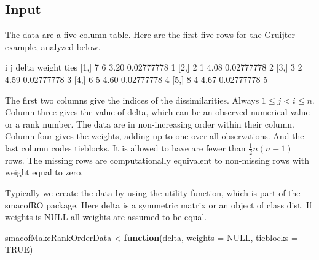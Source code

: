 \documentclass[
  12pt,
]{article}
\newenvironment{Shaded}{\begin{snugshade}}{\end{snugshade}}
\newcommand{\AttributeTok}[1]{\textcolor[rgb]{0.13,0.29,0.53}{#1}}
\newcommand{\ConstantTok}[1]{\textcolor[rgb]{0.56,0.35,0.01}{#1}}
\newcommand{\ControlFlowTok}[1]{\textcolor[rgb]{0.13,0.29,0.53}{\textbf{#1}}}
\newcommand{\DecValTok}[1]{\textcolor[rgb]{0.00,0.00,0.81}{#1}}
\newcommand{\FloatTok}[1]{\textcolor[rgb]{0.00,0.00,0.81}{#1}}
\newcommand{\NormalTok}[1]{#1}
\newcommand{\OtherTok}[1]{\textcolor[rgb]{0.56,0.35,0.01}{#1}}
\begin{document}
\subsection{Input}\label{input}

The data are a five column table. Here are the first five rows for
the Gruijter example, analyzed below.

\begin{Shaded}
\begin{Highlighting}[]
\NormalTok{     i j delta     weight ties}
\NormalTok{[}\DecValTok{1}\NormalTok{,] }\DecValTok{7} \DecValTok{6}  \FloatTok{3.20} \FloatTok{0.02777778}    \DecValTok{1}
\NormalTok{[}\DecValTok{2}\NormalTok{,] }\DecValTok{2} \DecValTok{1}  \FloatTok{4.08} \FloatTok{0.02777778}    \DecValTok{2}
\NormalTok{[}\DecValTok{3}\NormalTok{,] }\DecValTok{3} \DecValTok{2}  \FloatTok{4.59} \FloatTok{0.02777778}    \DecValTok{3}
\NormalTok{[}\DecValTok{4}\NormalTok{,] }\DecValTok{6} \DecValTok{5}  \FloatTok{4.60} \FloatTok{0.02777778}    \DecValTok{4}
\NormalTok{[}\DecValTok{5}\NormalTok{,] }\DecValTok{8} \DecValTok{4}  \FloatTok{4.67} \FloatTok{0.02777778}    \DecValTok{5}
\end{Highlighting}
\end{Shaded}

The first two columns give the indices of the dissimilarities. Always \(1\leq j<i\leq n\).
Column three gives the value of delta, which can be an observed numerical value or
a rank number. The data are in non-increasing order within their
column. Column four gives the weights, adding up to one over all observations.
And the last column codes tieblocks. It is allowed to have are fewer than \(\frac12n(n-1)\) rows.
The missing rows are computationally equivalent to non-missing rows with weight equal to zero.

Typically we create the data by using the utility function, which is part of the
smacofRO package. Here delta is a symmetric matrix or an object of class dist.
If weights is NULL all weights are assumed to be equal.

\begin{Shaded}
\begin{Highlighting}[]
\NormalTok{smacofMakeRankOrderData }\OtherTok{\textless{}{-}}\ControlFlowTok{function}\NormalTok{(delta, }\AttributeTok{weights =} \ConstantTok{NULL}\NormalTok{, }\AttributeTok{tieblocks =} \ConstantTok{TRUE}\NormalTok{)}
\end{Highlighting}
\end{Shaded}
\end{document}
